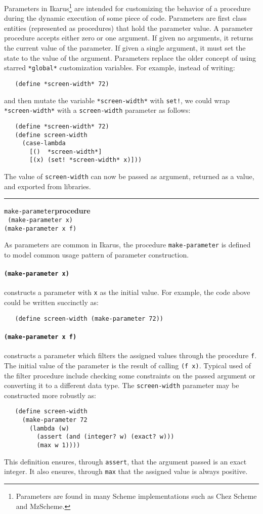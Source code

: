 \documentclass[onecolumn, 12pt, twoside, openright, dvipdfm]{book}
\makeatletter
\newcommand{\idxlabeldefun}[5]{
\vspace{1ex}
\rule{\textwidth}{2pt}
{\phantomsection\index{#1@\texttt{#2}}\label{#3}{\Large\texttt{#4}}\hfill\textbf{#5}}\\}
\newcommand{\idxdefun}[3]{\idxlabeldefun{#1}{#2}{#1}{#2}{#3}}
\newcommand{\defun}[2]{\idxdefun{#1}{#1}{#2}}
\makeatother
\begin{document}
Parameters in Ikarus\footnote{Parameters are found in many Scheme
implementations such as Chez Scheme and MzScheme.} are intended for
customizing the behavior of a procedure during the dynamic execution
of some piece of code.  Parameters are first class entities
(represented as procedures) that hold the parameter value.  A
parameter procedure accepts either zero or one argument.  If given
no arguments, it returns the current value of the parameter.  If
given a single argument, it must set the state to the value of the
argument.  Parameters replace the older concept of using starred
\texttt{*global*} customization variables.  For example, instead of
writing:
\begin{verbatim}
   (define *screen-width* 72)
\end{verbatim}
and then mutate the variable \texttt{*screen-width*} with
\texttt{set!}, we could wrap \texttt{*screen-width*} with a 
\texttt{screen-width} parameter as follows:
\begin{verbatim}
   (define *screen-width* 72)
   (define screen-width 
     (case-lambda
       [()  *screen-width*]
       [(x) (set! *screen-width* x)]))
\end{verbatim}

The value of \texttt{screen-width} can now be passed as argument,
returned as a value, and exported from libraries.

\defun{make-parameter}{procedure}
\texttt{
(make-parameter x)\\
(make-parameter x f)
}

As parameters are common in Ikarus, the procedure
\texttt{make-parameter} is defined to model common usage pattern of
parameter construction. 

\paragraph{\texttt{(make-parameter x)}} constructs a parameter
with \texttt{x} as the initial value.  For example, the code above
could be written succinctly as:
\begin{verbatim}
   (define screen-width (make-parameter 72))
\end{verbatim}

\paragraph{\texttt{(make-parameter x f)}} constructs a parameter
which filters the assigned values through the procedure \texttt{f}.
The initial value of the parameter is the result of calling
\texttt{(f~x)}.  Typical used of the filter procedure include
checking some constraints on the passed argument or converting it to
a different data type.  The \texttt{screen-width} parameter may be
constructed more robustly as:
\begin{verbatim}
   (define screen-width 
     (make-parameter 72
       (lambda (w)
         (assert (and (integer? w) (exact? w)))
         (max w 1))))
\end{verbatim}
This definition ensures, through \texttt{assert}, that the argument
passed is an exact integer.  It also ensures, through \texttt{max}
that the assigned value is always positive.
\end{document}
